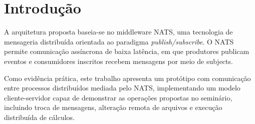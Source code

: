 \section{Introdução}
\label{introducao}

A arquitetura proposta baseia-se no middleware NATS, uma tecnologia de mensageria distribuída orientada ao paradigma \textit{publish/subscribe}. O NATS permite comunicação assíncrona de baixa latência, em que produtores publicam eventos e consumidores inscritos recebem mensagens por meio de subjects.

Como evidência prática, este trabalho apresenta um protótipo com comunicação entre processos distribuídos mediada pelo NATS, implementando um modelo cliente-servidor capaz de demonstrar as operações propostas no seminário, incluindo troca de mensagens, alteração remota de arquivos e execução distribuída de cálculos.
















